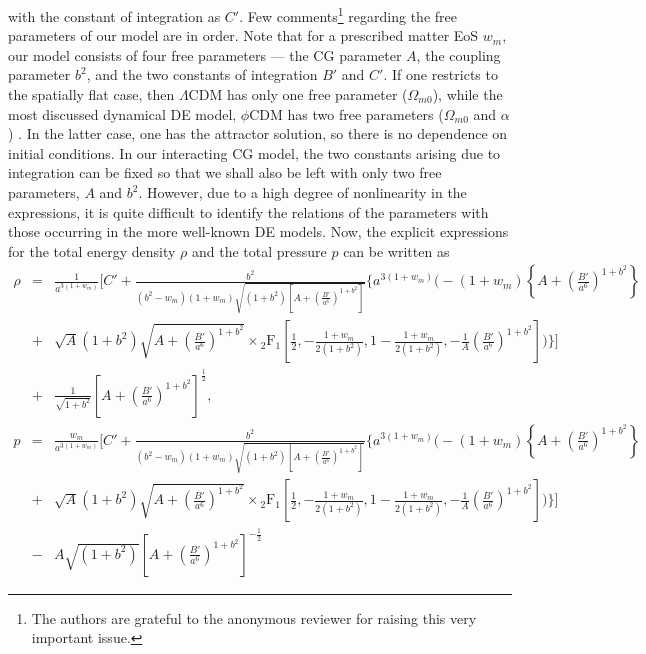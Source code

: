 \documentclass[two-column, nofootinbib]{revtex4-1}
\begin{document}
with the constant of integration as $C'$. Few comments\footnote{The authors are grateful to the anonymous reviewer for raising this very important issue.} regarding the free parameters of our model are in order. Note that for a prescribed matter EoS $w_m$, our model consists of four free parameters --- the CG parameter $A$, the coupling parameter $b^2$, and the two constants of integration $B'$ and $C'$. If one restricts to the spatially flat case, then $\Lambda$CDM has only one free parameter ($\Omega _{m0}$), while the most discussed dynamical DE model, $\phi$CDM has two free parameters ($\Omega _{m0}$ and $\alpha$) \cite{Peebles1,Ratra1}. In the latter case, one has the attractor solution, so there is no dependence on initial conditions. In our interacting CG model, the two constants arising due to integration can be fixed so that we shall also be left with only two free parameters, $A$ and $b^2$. However, due to a high degree of nonlinearity in the expressions, it is quite difficult to identify the relations of the parameters with those occurring in the more well-known DE models. Now, the explicit expressions for the total energy density $\rho$ and the total pressure $p$ can be written as
\begin{eqnarray}
\rho &=& \frac{1}{a^{3(1+w_m)}}\Biggl[C'+\frac{b^2}{(b^2-w_m)(1+w_m)\sqrt{(1+b^2)\left[A+\left(\frac{B'}{a^6}\right)^{1+b^2}\right]}}\Bigg\lbrace a^{3(1+w_m)}\Biggl(-(1+w_m) \left\lbrace A+\left(\frac{B'}{a^6}\right)^{1+b^2} \right\rbrace \nonumber \\
&+& \sqrt{A}(1+b^2)\sqrt{A+\left(\frac{B'}{a^6}\right)^{1+b^2}}\times {_2\text{F}_{1}}\left[\frac{1}{2},-\frac{1+w_m}{2(1+b^2)},1-\frac{1+w_m}{2(1+b^2)},-\frac{1}{A}{\left(\frac{B'}{a^6}\right)}^{1+b^2}\right]\Biggr)\Bigg\rbrace \Biggr] \nonumber \\
&+& \frac{1}{\sqrt{1+b^2}}\left[A+\left(\frac{B'}{a^6}\right)^{1+b^2 }\right]^{\frac{1}{2}}, \label{rhoint}
\end{eqnarray}
\begin{eqnarray}
p &=& \frac{w_m}{a^{3(1+w_m)}}\Biggl[C'+\frac{b^2}{(b^2-w_m)(1+w_m)\sqrt{(1+b^2)\left[A+\left(\frac{B'}{a^6}\right)^{1+b^2}\right]}}\Bigg\lbrace a^{3(1+w_m)}\Biggl(-(1+w_m) \left\lbrace A+\left(\frac{B'}{a^6}\right)^{1+b^2} \right\rbrace \nonumber \\
&+& \sqrt{A}(1+b^2)\sqrt{A+\left(\frac{B'}{a^6}\right)^{1+b^2}}\times {_2\text{F}_{1}}\left[\frac{1}{2},-\frac{1+w_m}{2(1+b^2)},1-\frac{1+w_m}{2(1+b^2)},-\frac{1}{A}{\left(\frac{B'}{a^6}\right)}^{1+b^2}\right]\Biggr)\Bigg\rbrace \Biggr] \nonumber \\
&-& A\sqrt{(1+b^2)} \left[A+\left(\frac{B'}{a^6}\right)^{1+b^2}\right]^{-\frac{1}{2}} \label{pint}
\end{eqnarray}
\end{document}
